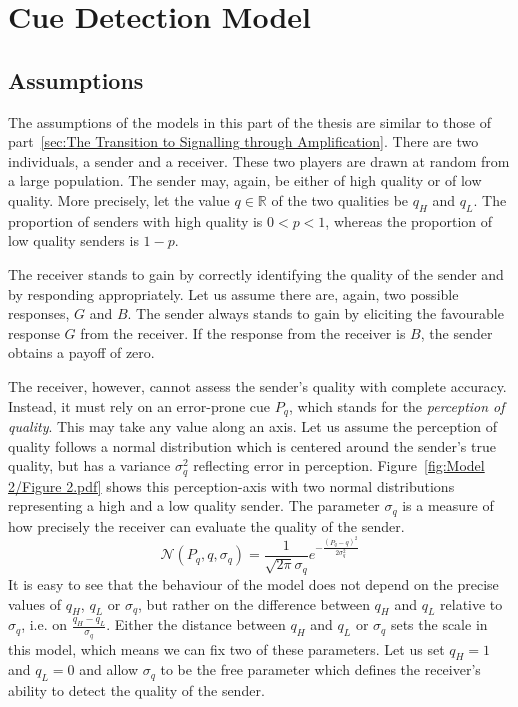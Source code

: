 \documentclass[a4paper,12pt]{article}
\numberwithin{equation}{section}
\begin{document}
\newpage\clearpage


\section{Cue Detection Model}
\label{sec:Cue Detection Model}
\subsection{Assumptions}
\label{sec:CueDetectionModel/Assumptions}

The assumptions of the models in this part of the thesis are similar to those of part~\ref{sec:The Transition to Signalling through Amplification}. There are two individuals, a sender and a receiver. These two players are drawn at random from a large population. The sender may, again, be either of high quality or of low quality. More precisely, let the value $q \in \mathbb{R}$ of the two qualities be $q_{H}$ and $q_{L}$. The proportion of senders with high quality is $0<p<1$, whereas the proportion of low quality senders is $1-p$.

The receiver stands to gain by correctly identifying the quality of the sender and by responding appropriately. Let us assume there are, again, two possible responses, $G$ and $B$. The sender always stands to gain by eliciting the favourable response $G$ from the receiver. If the response from the receiver is $B$, the sender obtains a payoff of zero.

The receiver, however, cannot assess the sender's quality with complete accuracy. Instead, it must rely on an error-prone cue $P_{q}$, which stands for the \textit{perception of quality}. This may take any value along an axis. Let us assume the perception of quality follows a normal distribution which is centered around the sender's true quality, but has a variance $\sigma^{2}_{q}$ reflecting error in perception. Figure~\ref{fig:Model 2/Figure 2.pdf} shows this perception-axis with two normal distributions representing a high and a low quality sender. The parameter $\sigma_{q}$ is a measure of how precisely the receiver can evaluate the quality of the sender.
\begin{equation}
\label{eq:CueDetectionModel/Normal}
\mathcal{N}(P_{q}, q, \sigma_{q}) = \frac{1}{\sqrt{2 \pi} \sigma_{q}} e^{-\frac{(P_{q}-q)^2}{2 \sigma_{q}^2}}
\end{equation}
It is easy to see that the behaviour of the model does not depend on the precise values of $q_{H}$, $q_{L}$ or $\sigma_{q}$, but rather on the difference between $q_{H}$ and $q_{L}$ relative to $\sigma_{q}$, i.e. on $\frac{q_{H}-q_{L}}{\sigma_{q}}$. Either the distance between $q_{H}$ and $q_{L}$ or $\sigma_{q}$ sets the scale in this model, which means we can fix two of these parameters. Let us set $q_{H}=1$ and $q_{L}=0$ and allow $\sigma_{q}$ to be the free parameter which defines the receiver's ability to detect the quality of the sender.
\end{document}

